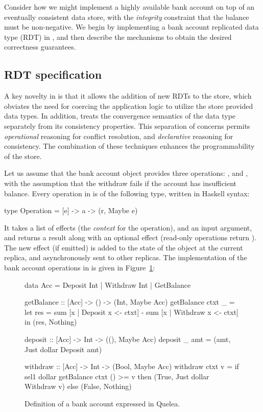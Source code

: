 Consider how we might implement a highly available bank account on top of an
eventually consistent data store, with the \emph{integrity} constraint that the
balance must be non-negative. We begin by implementing a bank account
replicated data type (RDT) in \quelea, and then describe the mechanisms to
obtain the desired correctness guarantees.

\subsection{RDT specification}

A key novelty in \quelea is that it allows the addition of new RDTs to the
store, which obviates the need for coercing the application logic to utilize
the store provided data types. In addition, \quelea treats the convergence
semantics of the data type separately from its consistency properties. This
separation of concerns permits \emph{operational} reasoning for conflict
resolution, and \emph{declarative} reasoning for consistency. The combination
of these techniques enhances the programmability of the store.

Let us assume that the bank account object provides three operations:
,  and , with the assumption that the
withdraw fails if the account has insufficient balance. Every operation in
\quelea is of the following type, written in Haskell syntax:

\begin{codehaskell}
type Operation = [e] -> a -> (r, Maybe e)
\end{codehaskell}

\noindent It takes a list of effects (the \emph{context} for the operation),
and an input argument, and returns a result along with an optional effect
(read-only operations return ). The new effect (if emitted) is
added to the state of the object at the current replica, and asynchronously
sent to other replicas. The implementation of the bank account operations in
\quelea is given in Figure~\ref{fig:ex}:

\begin{figure}
\begin{codehaskell}
data Acc = Deposit Int | Withdraw Int | GetBalance

getBalance :: [Acc] -> () -> (Int, Maybe Acc)
getBalance ctxt _ =
  let res = sum [x | Deposit x <- ctxt]
						- sum [x | Withdraw x <- ctxt]
	in (res, Nothing)

deposit :: [Acc] -> Int -> ((), Maybe Acc)
deposit _ amt = (amt, Just dollar Deposit amt)

withdraw :: [Acc] -> Int -> (Bool, Maybe Acc)
withdraw ctxt v =
	if sel1 dollar getBalance ctxt () >= v
  then (True, Just dollar Withdraw v)
	else (False, Nothing)
\end{codehaskell}
\caption{Definition of a bank account expressed in Quelea.}
\label{fig:ex}
\end{figure}

